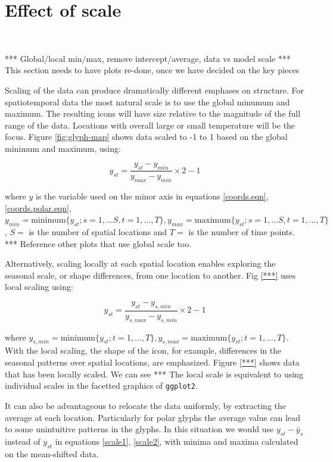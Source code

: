 \documentclass[oneside]{article}
\begin{document}
\section{Effect of scale}~\label{sec:scale}

*** Global/local min/max, remove intercept/average, data vs model scale
*** This section needs to have plots re-done, once we have decided on the key pieces

Scaling of the data can produce dramatically different emphases on
structure. For spatiotemporal data the most natural scale is to use
the global minumum and maximum. The resulting icons will have size
relative to the magnitude of the full range of the data. Locations
with overall large or small temperature will be the focus. Figure
\ref{fig:glyph-map} shows data scaled to -1 to 1 based on the global
minimum and maximum, using:

\begin{equation}
y_{st} = \frac{y_{st}-y_{min}}{y_{max}-y_{min}} \times 2 - 1
\label{scale1}
\end{equation}

\noindent where $y$ is the variable used on the minor axis in equations \ref{coords.eqn}, \ref{coords.polar.eqn}, $y_{min} = \mbox{minimum}\{y_{st}; s=1, \dots S, t=1, ..., T \}, y_{max} = \mbox{maximum}\{y_{st}; s=1, \dots S, t=1, ..., T\}$, $S=$ is the number of spatial locations and $T=$ is the number of time points. *** Reference other plots that use global scale too.

Alternatively, scaling locally at each spatial location enables
exploring the seasonal scale, or shape differences, from one location
to another. Fig \ref{***} uses local scaling using:

\begin{equation}
y_{st} = \frac{y_{st}-y_{s,min}}{y_{s,max}-y_{s,min}} \times 2 - 1
\label{scale2}
\end{equation}

\noindent where $y_{s, min} = \mbox{minimum}\{y_{st}; t=1, ..., T \}, y_{s,max} = \mbox{maximum}\{y_{st}; t=1, ..., T\}$. With the local scaling, the shape of the icon, for example, differences in the seasonal patterns over spatial locations, are emphasized.
Figure \ref{***} shows data that has been locally scaled. We can see *** The local scale is equivalent to using individual scales in the facetted graphics of \texttt{ggplot2}.

It can also be advantageous to relocate the data uniformly, by extracting the average at each location. Particularly for polar glyphs the average value can lead to some unintuitive patterns in the glyphs. In this situation we would use $y_{st}-\bar{y}_s$ instead of $y_{st}$ in equations \ref{scale1}, \ref{scale2}, with minima and maxima calculated on the mean-shifted data.
\end{document}
